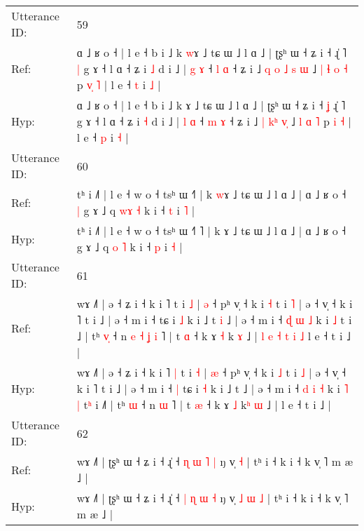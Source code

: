 \documentclass[10pt]{article}
\DeclareRobustCommand{\hl}[1]{{\textcolor{red}{#1}}}
\begin{document}
\begin{longtable}{ll}
 \\
\midrule
Utterance ID: & 59 \\
Ref: & ɑ ˩ ʁ o ˧ | l e ˧ b i ˩ k \hl{w}ɤ ˩ tɕ ɯ ˩ l ɑ ˩ | ʈʂʰ ɯ ˧ ʑ i ˧\hl{}\hl{} ɻ̍ ˥\hl{ }\hl{|} g ɤ ˧ l ɑ ˧ ʑ i \hl{˩} d i ˩ | \hl{g} \hl{ɤ} ˧ \hl{l} \hl{ɑ} ˧ ʑ i ˩ \hl{q} \hl{o}\hl{ }\hl{˩} \hl{s}\hl{ }\hl{ɯ} ˩\hl{ }\hl{|} \hl{ɬ} \hl{o} \hl{˧} p \hl{v}\hl{̩} \hl{˥} | l e ˧ \hl{t} i \hl{˩} |
 \\
Hyp: & ɑ ˩ ʁ o ˧ | l e ˧ b i ˩ k \hl{}ɤ ˩ tɕ ɯ ˩ l ɑ ˩ | ʈʂʰ ɯ ˧ ʑ i ˧\hl{ }\hl{ʝ} ɻ̍ ˥\hl{}\hl{} g ɤ ˧ l ɑ ˧ ʑ i \hl{˧} d i ˩ | \hl{l} \hl{ɑ} ˧ \hl{m} \hl{ɤ} ˧ ʑ i ˩ \hl{|} \hl{}\hl{k}\hl{ʰ} \hl{}\hl{v}\hl{̩} ˩\hl{}\hl{} \hl{l} \hl{ɑ} \hl{˥} p \hl{}\hl{i} \hl{˧} | l e ˧ \hl{p} i \hl{˧} |
 \\
\midrule
Utterance ID: & 60 \\
Ref: & tʰ i ˩˥ | l e ˧ w o ˧ tsʰ ɯ ˧\hl{}\hl{}˥ | k \hl{w}ɤ ˩ tɕ ɯ ˩ l ɑ ˩ | ɑ ˩ ʁ o ˧\hl{ }\hl{|} g ɤ ˩ q \hl{w}\hl{ɤ} \hl{˧} k i ˧ \hl{t} i \hl{˥} |
 \\
Hyp: & tʰ i ˩˥ | l e ˧ w o ˧ tsʰ ɯ ˧\hl{˥}\hl{ }˥ | k \hl{}ɤ ˩ tɕ ɯ ˩ l ɑ ˩ | ɑ ˩ ʁ o ˧\hl{}\hl{} g ɤ ˩ q \hl{}\hl{o} \hl{˥} k i ˧ \hl{p} i \hl{˧} |
 \\
\midrule
Utterance ID: & 61 \\
Ref: & wɤ ˩˥ | ə ˧ ʑ i ˧ k i ˥\hl{}\hl{} t i \hl{˩} | \hl{ə} ˧ pʰ v̩ ˧ k i \hl{˧} t i \hl{˥} | ə ˧ v̩ ˧ k i ˥ t i ˩ | ə ˧ m i ˧\hl{}\hl{} tɕ i \hl{˩} k i ˩ t\hl{ }\hl{i} ˩ | ə ˧ m i ˧ \hl{ɖ} \hl{ɯ} \hl{˩} k i\hl{}\hl{} \hl{˩} t\hl{} i ˩\hl{} | tʰ \hl{v}\hl{̩} ˧ n\hl{ }\hl{e}\hl{ }\hl{˧}\hl{ }\hl{ʝ} \hl{i} ˥ | t \hl{ɑ} ˧ k ɤ \hl{˧} k\hl{} \hl{ɤ} ˩ |\hl{ }\hl{l}\hl{ }\hl{e}\hl{ }\hl{˧}\hl{ }\hl{t}\hl{ }\hl{i}\hl{ }\hl{˩} l e ˧ t i ˩ |
 \\
Hyp: & wɤ ˩˥ | ə ˧ ʑ i ˧ k i ˥\hl{ }\hl{|} t i \hl{˧} | \hl{æ} ˧ pʰ v̩ ˧ k i \hl{˩} t i \hl{˩} | ə ˧ v̩ ˧ k i ˥ t i ˩ | ə ˧ m i ˧\hl{ }\hl{|} tɕ i \hl{˧} k i ˩ t\hl{}\hl{} ˩ | ə ˧ m i ˧ \hl{d} \hl{i} \hl{˧} k i\hl{ }\hl{˥} \hl{|} t\hl{ʰ} i ˩\hl{˥} | tʰ \hl{}\hl{ɯ} ˧ n\hl{}\hl{}\hl{}\hl{}\hl{}\hl{} \hl{ɯ} ˥ | t \hl{æ} ˧ k ɤ \hl{˩} k\hl{ʰ} \hl{ɯ} ˩ |\hl{}\hl{}\hl{}\hl{}\hl{}\hl{}\hl{}\hl{}\hl{}\hl{}\hl{}\hl{} l e ˧ t i ˩ |
 \\
\midrule
Utterance ID: & 62 \\
Ref: & wɤ ˩˥ | ʈʂʰ ɯ ˧ ʑ i ˧ ɻ̍ ˧ \hl{ɳ} \hl{ɯ} \hl{˥} \hl{|} ŋ v̩\hl{}\hl{}\hl{}\hl{} \hl{˧} | tʰ i ˧ k i ˧ k v̩ ˥ m æ ˩ |
 \\
Hyp: & wɤ ˩˥ | ʈʂʰ ɯ ˧ ʑ i ˧ ɻ̍ ˧ \hl{|} \hl{ɳ} \hl{ɯ} \hl{˧} ŋ v̩\hl{ }\hl{˩}\hl{ }\hl{ɯ} \hl{˩} | tʰ i ˧ k i ˧ k v̩ ˥ m æ ˩ |

\end{longtable}
\end{document}
